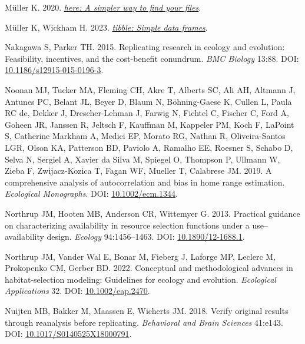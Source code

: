 \documentclass[10pt,a4paper]{article}
\newlength{\cslhangindent}
\newlength{\cslentryspacingunit} %
\newenvironment{CSLReferences}[2] %
 {%
  \setlength{\parindent}{0pt}
  \ifodd #1
  \let\oldpar\par
  \def\par{\hangindent=\cslhangindent\oldpar}
  \fi
  \setlength{\parskip}{#2\cslentryspacingunit}
 }%
 {}
\begin{document}
\begin{CSLReferences}{1}{0}
\leavevmode{}%
Müller K. 2020. \emph{\href{https://CRAN.R-project.org/package=here}{{here}: A simpler way to find your files}}.

\leavevmode{}%
Müller K, Wickham H. 2023. \emph{\href{https://CRAN.R-project.org/package=tibble}{{tibble}: Simple data frames}}.

\leavevmode{}%
Nakagawa S, Parker TH. 2015. Replicating research in ecology and evolution: Feasibility, incentives, and the cost-benefit conundrum. \emph{BMC Biology} 13:88. DOI: \href{https://doi.org/10.1186/s12915-015-0196-3}{10.1186/s12915-015-0196-3}.

\leavevmode{}%
Noonan MJ, Tucker MA, Fleming CH, Akre T, Alberts SC, Ali AH, Altmann J, Antunes PC, Belant JL, Beyer D, Blaum N, Böhning-Gaese K, Cullen L, Paula RC de, Dekker J, Drescher-Lehman J, Farwig N, Fichtel C, Fischer C, Ford A, Goheen JR, Janssen R, Jeltsch F, Kauffman M, Kappeler PM, Koch F, LaPoint S, Catherine Markham A, Medici EP, Morato RG, Nathan R, Oliveira-Santos LGR, Olson KA, Patterson BD, Paviolo A, Ramalho EE, Roesner S, Schabo D, Selva N, Sergiel A, Xavier da Silva M, Spiegel O, Thompson P, Ullmann W, Zieba F, Zwijacz-Kozica T, Fagan WF, Mueller T, Calabrese JM. 2019. A comprehensive analysis of autocorrelation and bias in home range estimation. \emph{Ecological Monographs}. DOI: \href{https://doi.org/10.1002/ecm.1344}{10.1002/ecm.1344}.

\leavevmode{}%
Northrup JM, Hooten MB, Anderson CR, Wittemyer G. 2013. Practical guidance on characterizing availability in resource selection functions under a use--availability design. \emph{Ecology} 94:1456--1463. DOI: \href{https://doi.org/10.1890/12-1688.1}{10.1890/12-1688.1}.

\leavevmode{}%
Northrup JM, Vander Wal E, Bonar M, Fieberg J, Laforge MP, Leclerc M, Prokopenko CM, Gerber BD. 2022. Conceptual and methodological advances in habitat‐selection modeling: Guidelines for ecology and evolution. \emph{Ecological Applications} 32. DOI: \href{https://doi.org/10.1002/eap.2470}{10.1002/eap.2470}.

\leavevmode{}%
Nuijten MB, Bakker M, Maassen E, Wicherts JM. 2018. Verify original results through reanalysis before replicating. \emph{Behavioral and Brain Sciences} 41:e143. DOI: \href{https://doi.org/10.1017/S0140525X18000791}{10.1017/S0140525X18000791}.


\end{CSLReferences}
\end{document}
